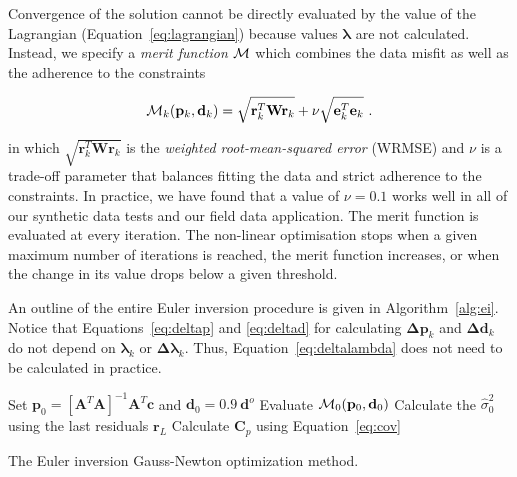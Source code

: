 Convergence of the solution cannot be directly evaluated by the value of the Lagrangian
(Equation~\ref{eq:lagrangian}) because values $\boldsymbol{\lambda}$ are
not calculated.
Instead, we specify a \textit{merit function} $\operatorname{\mathcal{M}}$ which combines the data
misfit as well as the adherence to the constraints

\begin{equation}
  \operatorname{\mathcal{M}}_k(\mathbf{p}_k, \mathbf{d}_k) =
  \sqrt{\mathbf{r}_k^T\mathbf{W}\mathbf{r}_k}
  + \nu\sqrt{\mathbf{e}_k^T\mathbf{e}_k}
  \ .
  \label{eq:merit}
\end{equation}

\noindent
in which $\sqrt{\mathbf{r}_k^T\mathbf{W}\mathbf{r}_k}$ is the
\textit{weighted root-mean-squared error} (WRMSE) and
$\nu$ is a trade-off parameter that balances fitting the data and strict adherence
to the constraints.
In practice, we have found that a value of $\nu=0.1$ works well in all of our
synthetic data tests and our field data application.
The merit function is evaluated at every iteration.
The non-linear optimisation stops when a given maximum number of iterations is
reached, the merit function increases, or when the change in its value drops
below a given threshold.

An outline of the entire Euler inversion procedure is given in
Algorithm~\ref{alg:ei}.
Notice that Equations~\ref{eq:deltap} and \ref{eq:deltad} for calculating
$\mathbf{\Delta p}_k$ and $\mathbf{\Delta d}_k$ do not depend on
$\boldsymbol{\lambda}_k$ or $\boldsymbol{\Delta\lambda}_k$.
Thus, Equation~\ref{eq:deltalambda} does not need to be calculated in practice.

\begin{algorithm}[!htb]
  Set
  $\mathbf{p}_0 = \left[\mathbf{A}^T\mathbf{A}\right]^{-1}\mathbf{A}^T\mathbf{c}$
  and $\mathbf{d}_0 = 0.9\ \mathbf{d}^o$
  \;
  Evaluate $\operatorname{\mathcal{M}}_0(\mathbf{p}_0, \mathbf{d}_0)$
  \;
  Calculate the $\hat{\sigma}_0^2$ using the last residuals $\mathbf{r}_L$
  \;
  Calculate $\mathbf{C}_p$ using Equation~\ref{eq:cov}
  \;
  \BlankLine
  \caption{The Euler inversion Gauss-Newton optimization method.}
  \label{alg:ei}
\end{algorithm}

